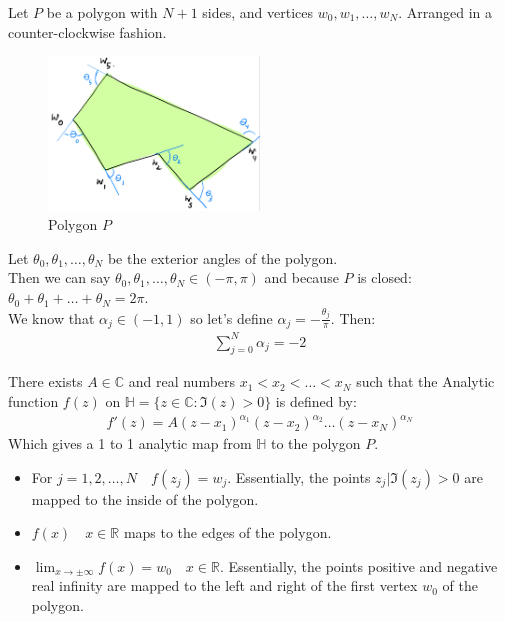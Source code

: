 \begin{proposition}
    Let $P$ be a polygon with $N +1$ sides, and vertices $w_0, w_1, \ldots, w_N$. Arranged in a counter-clockwise fashion.\\
    \begin{figure}[H]
        \centering
        \includegraphics[width=0.5\textwidth]{LECTURE_17/graph9.png}
        \caption{Polygon $P$}
    \end{figure}

    Let $\theta_0, \theta_1, \ldots, \theta_N$ be the exterior angles of the polygon.\\
    Then we can say $\theta_0, \theta_1, \ldots, \theta_N \in (-\pi, \pi)$ and because $P$ is closed: $\theta_0 + \theta_1 + \ldots + \theta_N = 2\pi$.\\
    We know that $\alpha_j \in (-1, 1)$ so let's define $\alpha_j = -\frac{\theta_j}{\pi}$. Then:
    \begin{align*}
        \sum_{j = 0}^{N} \alpha_j = -2
    \end{align*}
\end{proposition}

\begin{theorem}
    There exists $A \in \mathbb{C}$ and real numbers $x_1 < x_2 < \ldots < x_N$ such that the Analytic function $f(z)$ on $\mathbb{H} = \{z \in \mathbb{C} : \Im (z) > 0\}$ is defined by:
    \begin{align*}
        f'(z) = A(z - x_1)^{\alpha_1}(z - x_2)^{\alpha_2}\ldots(z - x_N)^{\alpha_N}
    \end{align*}
    Which gives a 1 to 1 analytic map from $\mathbb{H}$ to the polygon $P$.
    \begin{itemize}
        \item For $j = 1, 2, \ldots, N \quad f(z_j) = w_j$. Essentially, the points $z_j | \Im (z_j) > 0$ are mapped to the inside of the polygon.
        \item $f(x) \quad x \in \mathbb{R}$ maps to the edges of the polygon.
        \item $\lim_{x \to \pm \infty} f(x) = w_0 \quad x \in \mathbb{R}$. Essentially, the points positive and negative real infinity are mapped to the left and right of the first vertex $w_0$ of the polygon.
    \end{itemize}
\end{theorem}

